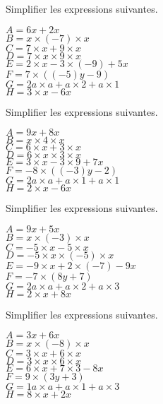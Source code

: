 \documentclass[a4paper,11pt,fleqn]{article}
\begin{document}
\begin{multicols}{2}
Simplifier les expressions suivantes.

\begin{multicols}{2}
$A=6 x +2 x$\\
$B=x\times (-7) \times x$\\
$C=7\times x +9\times x$\\
$D=7\times x\times 9\times x$\\
$E=2 \times x-3\times (-9) +5 x$\\
$F=7 \times ((-5)y -9)$\\
$G=2 a\times  a+a\times 2+a\times 1$\\
$H= 3\times x -6x$
\end{multicols}

Simplifier les expressions suivantes.

\begin{multicols}{2}
$A=9 x +8 x$\\
$B=x\times 4 \times x$\\
$C=6\times x +3\times x$\\
$D=6\times x\times 3\times x$\\
$E=3 \times x-3\times 9 +7 x$\\
$F=-8 \times ((-3)y -2)$\\
$G=2 a\times  a+a\times 1+a\times 1$\\
$H= 2\times x -6x$
\end{multicols}

Simplifier les expressions suivantes.

\begin{multicols}{2}
$A=9 x +5 x$\\
$B=x\times (-3) \times x$\\
$C=-5\times x -5\times x$\\
$D=-5\times x\times (-5)\times x$\\
$E=-9 \times x+2\times (-7) -9 x$\\
$F=-7 \times (8y +7)$\\
$G=2 a\times  a+a\times 2+a\times 3$\\
$H= 2\times x +8x$
\end{multicols}

Simplifier les expressions suivantes.

\begin{multicols}{2}
$A=3 x +6 x$\\
$B=x\times (-8) \times x$\\
$C=3\times x +6\times x$\\
$D=3\times x\times 6\times x$\\
$E=6 \times x+7\times 3 -8 x$\\
$F=9 \times (3y +3)$\\
$G=1 a\times  a+a\times 1+a\times 3$\\
$H= 8\times x +2x$
\end{multicols}
%
%
%


\end{multicols}
\end{document}
